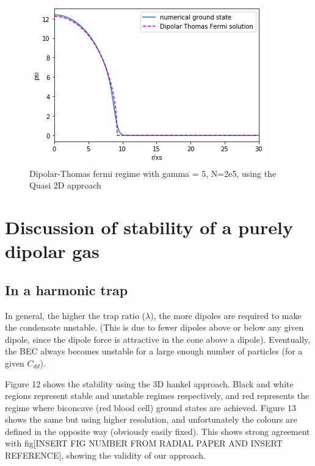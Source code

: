 \documentclass[10pt]{article}
\numberwithin{equation}{section}
\begin{document}
\begin{multicols}{2}
\begin{figure}[H]
\centering
\includegraphics[width=0.8\linewidth]{Dipolar Thomas Fermi Quasi 2D Hankel gamma = 80 No = 2e4}
\caption{Dipolar-Thomas fermi regime with gamma = 5, N=2e5, using the Quasi 2D approach}
\end{figure}

\section{Discussion of stability of a purely dipolar gas}

\subsection{In a harmonic trap}

In general, the higher the trap ratio ($\lambda$), the more dipoles are required to make the condensate unstable. (This is due to fewer dipoles above or below any given dipole, since the dipole force is attractive in the cone above a dipole). Eventually, the BEC always becomes unstable for a large enough number of particles (for a given $C_{dd}$).

Figure 12 shows the stability using the 3D hankel approach. Black and white regions represent stable and unstable regimes respectively, and red represents the regime where biconcave (red blood cell) ground states are achieved. Figure 13 shows the same but using higher resolution, and unfortunately the colours are defined in the opposite way (obviously easily fixed). This shows strong agreement with fig[INSERT FIG NUMBER FROM RADIAL PAPER AND INSERT REFERENCE], showing the validity of our approach. 


\end{multicols}
\end{document}
